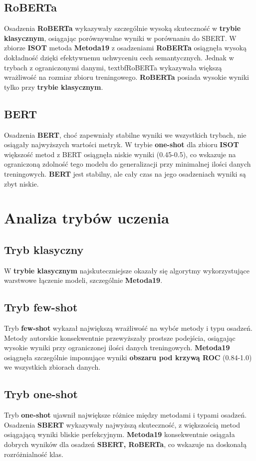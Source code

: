 \subsection{RoBERTa}
Osadzenia \textbf{RoBERTa} wykazywały szczególnie wysoką skuteczność w \textbf{trybie klasycznym}, osiągając porównywalne wyniki w porównaniu do SBERT. W zbiorze \textbf{ISOT} metoda \textbf{Metoda19} z osadzeniami \textbf{RoBERTa} osiągnęła wysoką dokładność dzięki efektywnemu uchwyceniu cech semantycznych. Jednak w trybach z ograniczonymi danymi, textbf{RoBERTa} wykazywała większą wrażliwość na rozmiar zbioru treningowego. \textbf{RoBERTa} posiada wysokie wyniki tylko przy \textbf{trybie klasycznym}.

\subsection{BERT}
Osadzenia \textbf{BERT}, choć zapewniały stabilne wyniki we wszystkich trybach, nie osiągały najwyższych wartości metryk. W trybie \textbf{one-shot} dla zbioru \textbf{ISOT} większość metod z BERT osiągnęła niskie wyniki (0.45-0.5), co wskazuje na ograniczoną zdolność tego modelu do generalizacji przy minimalnej ilości danych treningowych. \textbf{BERT} jest stabilny, ale cały czas na jego osadzeniach wyniki są zbyt niskie.

\section{Analiza trybów uczenia}
\subsection{Tryb klasyczny}
W \textbf{trybie klasycznym} najskuteczniejsze okazały się algorytmy wykorzystujące warstwowe łączenie modeli, szczególnie \textbf{Metoda19}.

\subsection{Tryb few-shot}
Tryb \textbf{few-shot} wykazał największą wrażliwość na wybór metody i typu osadzeń. Metody autorskie konsekwentnie przewyższały prostsze podejścia, osiągając wysokie wyniki przy ograniczonej ilości danych treningowych. \textbf{Metoda19} osiągnęła szczególnie imponujące wyniki \textbf{obszaru pod krzywą ROC} (0.84-1.0) we wszystkich zbiorach danych.

\subsection{Tryb one-shot}
Tryb \textbf{one-shot} ujawnił największe różnice między metodami i typami osadzeń. Osadzenia \textbf{SBERT} wykazywały najwyższą skuteczność, z większością metod osiągającą wyniki bliskie perfekcyjnym. \textbf{Metoda19} konsekwentnie osiągała dobrych wyników dla osadzeń \textbf{SBERT, RoBERTa}, co wskazuje na doskonałą rozróżnialność klas.

